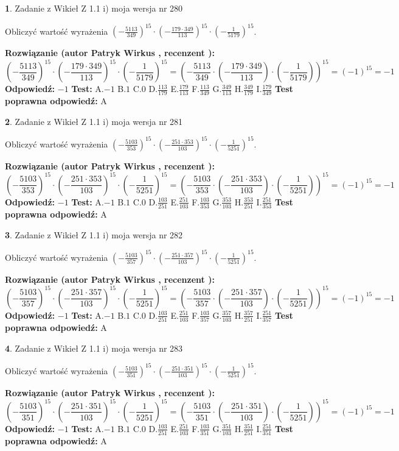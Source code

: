 \documentclass[12pt, a4paper]{article}
\theoremstyle{definition} %
\newtheorem{zad}{}
\newcommand{\zadStart}[1]{\begin{zad}#1\newline}
\newcommand{\zadStop}{\end{zad}}
\newcommand{\rozwStart}[2]{\noindent \textbf{Rozwiązanie (autor #1 , recenzent #2): }\newline}
\newcommand{\rozwStop}{\newline}
\newcommand{\odpStart}{\noindent \textbf{Odpowiedź:}\newline}
\newcommand{\odpStop}{\newline}
\newcommand{\testStart}{\noindent \textbf{Test:}\newline}
\newcommand{\testStop}{\newline}
\newcommand{\kluczStart}{\noindent \textbf{Test poprawna odpowiedź:}\newline}
\newcommand{\kluczStop}{\newline}
\begin{document}
\zadStart{Zadanie z Wikieł Z 1.1 i) moja wersja nr 280}

Obliczyć wartość wyrażenia $(-\frac{5113}{349})^{15} \cdot (-\frac{179 \cdot 349}{113})^{15} \cdot (-\frac{1}{5179})^{15}$.
\zadStop
\rozwStart{Patryk Wirkus}{}
$$(-\frac{5113}{349})^{15} \cdot (-\frac{179 \cdot 349}{113})^{15} \cdot (-\frac{1}{5179})^{15} = (-\frac{5113}{349} \cdot (-\frac{179 \cdot 349}{113}) \cdot (-\frac{1}{5179}))^{15} = (-1)^{15} = -1$$
\rozwStop
\odpStart
$-1$
\odpStop
\testStart
A.$-1$ B.$1$ C.$0$ D.$\frac{113}{179}$ E.$\frac{179}{113}$
F.$\frac{113}{349}$ G.$\frac{349}{113}$
H.$\frac{349}{179}$
I.$\frac{179}{349}$
\testStop
\kluczStart
A
\kluczStop



\zadStart{Zadanie z Wikieł Z 1.1 i) moja wersja nr 281}

Obliczyć wartość wyrażenia $(-\frac{5103}{353})^{15} \cdot (-\frac{251 \cdot 353}{103})^{15} \cdot (-\frac{1}{5251})^{15}$.
\zadStop
\rozwStart{Patryk Wirkus}{}
$$(-\frac{5103}{353})^{15} \cdot (-\frac{251 \cdot 353}{103})^{15} \cdot (-\frac{1}{5251})^{15} = (-\frac{5103}{353} \cdot (-\frac{251 \cdot 353}{103}) \cdot (-\frac{1}{5251}))^{15} = (-1)^{15} = -1$$
\rozwStop
\odpStart
$-1$
\odpStop
\testStart
A.$-1$ B.$1$ C.$0$ D.$\frac{103}{251}$ E.$\frac{251}{103}$
F.$\frac{103}{353}$ G.$\frac{353}{103}$
H.$\frac{353}{251}$
I.$\frac{251}{353}$
\testStop
\kluczStart
A
\kluczStop



\zadStart{Zadanie z Wikieł Z 1.1 i) moja wersja nr 282}

Obliczyć wartość wyrażenia $(-\frac{5103}{357})^{15} \cdot (-\frac{251 \cdot 357}{103})^{15} \cdot (-\frac{1}{5251})^{15}$.
\zadStop
\rozwStart{Patryk Wirkus}{}
$$(-\frac{5103}{357})^{15} \cdot (-\frac{251 \cdot 357}{103})^{15} \cdot (-\frac{1}{5251})^{15} = (-\frac{5103}{357} \cdot (-\frac{251 \cdot 357}{103}) \cdot (-\frac{1}{5251}))^{15} = (-1)^{15} = -1$$
\rozwStop
\odpStart
$-1$
\odpStop
\testStart
A.$-1$ B.$1$ C.$0$ D.$\frac{103}{251}$ E.$\frac{251}{103}$
F.$\frac{103}{357}$ G.$\frac{357}{103}$
H.$\frac{357}{251}$
I.$\frac{251}{357}$
\testStop
\kluczStart
A
\kluczStop



\zadStart{Zadanie z Wikieł Z 1.1 i) moja wersja nr 283}

Obliczyć wartość wyrażenia $(-\frac{5103}{351})^{15} \cdot (-\frac{251 \cdot 351}{103})^{15} \cdot (-\frac{1}{5251})^{15}$.
\zadStop
\rozwStart{Patryk Wirkus}{}
$$(-\frac{5103}{351})^{15} \cdot (-\frac{251 \cdot 351}{103})^{15} \cdot (-\frac{1}{5251})^{15} = (-\frac{5103}{351} \cdot (-\frac{251 \cdot 351}{103}) \cdot (-\frac{1}{5251}))^{15} = (-1)^{15} = -1$$
\rozwStop
\odpStart
$-1$
\odpStop
\testStart
A.$-1$ B.$1$ C.$0$ D.$\frac{103}{251}$ E.$\frac{251}{103}$
F.$\frac{103}{351}$ G.$\frac{351}{103}$
H.$\frac{351}{251}$
I.$\frac{251}{351}$
\testStop
\kluczStart
A
\kluczStop
\end{document}
